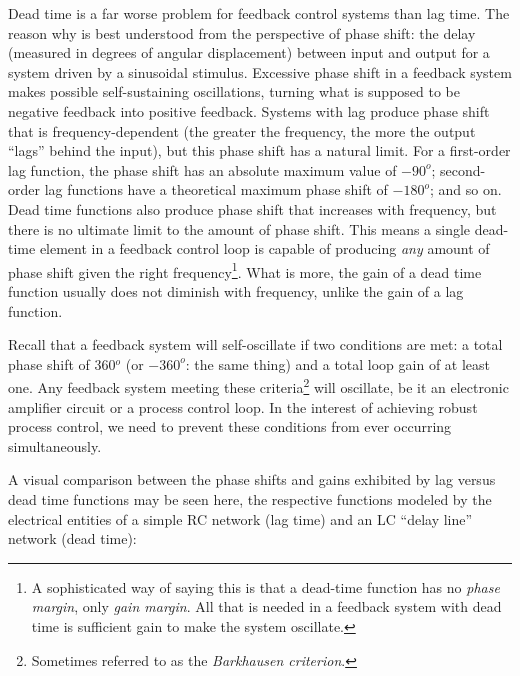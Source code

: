 Dead time is a far worse problem for feedback control systems than lag time.  The reason why is best understood from the perspective of phase shift: the delay (measured in degrees of angular displacement) between input and output for a system driven by a sinusoidal stimulus.  Excessive phase shift in a feedback system makes possible self-sustaining oscillations, turning what is supposed to be negative feedback into positive feedback.  Systems with lag produce phase shift that is frequency-dependent (the greater the frequency, the more the output ``lags'' behind the input), but this phase shift has a natural limit.  For a first-order lag function, the phase shift has an absolute maximum value of $-90^{o}$; second-order lag functions have a theoretical maximum phase shift of $-180^{o}$; and so on.  Dead time functions also produce phase shift that increases with frequency, but there is no ultimate limit to the amount of phase shift.  This means a single dead-time element in a feedback control loop is capable of producing \textit{any} amount of phase shift given the right frequency\footnote{A sophisticated way of saying this is that a dead-time function has no \textit{phase margin}, only \textit{gain margin}.  All that is needed in a feedback system with dead time is sufficient gain to make the system oscillate.}.  What is more, the gain of a dead time function usually does not diminish with frequency, unlike the gain of a lag function.      

Recall that a feedback system will self-oscillate if two conditions are met: a total phase shift of 360$^{o}$ (or $-360^{o}$: the same thing) and a total loop gain of at least one.  Any feedback system meeting these criteria\footnote{Sometimes referred to as the \textit{Barkhausen criterion}.} will oscillate, be it an electronic amplifier circuit or a process control loop.  In the interest of achieving robust process control, we need to prevent these conditions from ever occurring simultaneously.  

\filbreak

A visual comparison between the phase shifts and gains exhibited by lag versus dead time functions may be seen here, the respective functions modeled by the electrical entities of a simple RC network (lag time) and an LC ``delay line'' network (dead time):

